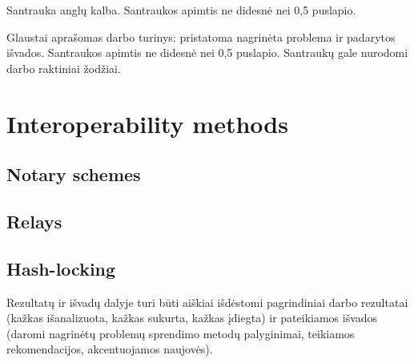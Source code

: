 \documentclass{VUMIFPSkursinis}
\title{\titlecap{Tema in title case english}}
\author{Vardenis Pavardenis}
\date{Vilnius – \the\year}
\begin{document}
	
\maketitle
\cleardoublepage{}
\setcounter{page}{2}

Santrauka anglų kalba. Santraukos apimtis ne didesnė nei 0,5 puslapio.

Glaustai aprašomas darbo turinys: pristatoma nagrinėta problema ir padarytos
išvados. Santraukos apimtis ne didesnė nei 0,5 puslapio. Santraukų gale
nurodomi darbo raktiniai žodžiai. 

\tableofcontents


\section{Interoperability methods}
\subsection{Notary schemes}

\subsection{Relays}

\subsection{Hash-locking}

Rezultatų ir išvadų dalyje turi būti aiškiai išdėstomi pagrindiniai darbo
rezultatai (kažkas išanalizuota, kažkas sukurta, kažkas įdiegta) ir pateikiamos
išvados (daromi nagrinėtų problemų sprendimo metodų palyginimai, teikiamos
rekomendacijos, akcentuojamos naujovės).


\printbibliography[heading=bibintoc, title=References]  %
\end{document}
